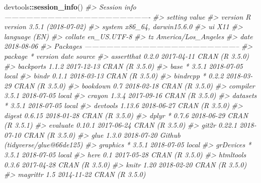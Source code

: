 \documentclass[]{book}
\newenvironment{Shaded}{\begin{snugshade}}{\end{snugshade}}
\newcommand{\CommentTok}[1]{\textcolor[rgb]{0.56,0.35,0.01}{\textit{#1}}}
\newcommand{\KeywordTok}[1]{\textcolor[rgb]{0.13,0.29,0.53}{\textbf{#1}}}
\newcommand{\NormalTok}[1]{#1}
\newcommand{\OperatorTok}[1]{\textcolor[rgb]{0.81,0.36,0.00}{\textbf{#1}}}
\theoremstyle{plain}
\theoremstyle{remark}
\theoremstyle{definition}
\theoremstyle{definition}
\theoremstyle{definition}
\theoremstyle{remark}
\begin{document}
\begin{Shaded}
\begin{Highlighting}[]
\NormalTok{devtools}\OperatorTok{::}\KeywordTok{session_info}\NormalTok{()}
\CommentTok{#> Session info -------------------------------------------------------------}
\CommentTok{#>  setting  value                       }
\CommentTok{#>  version  R version 3.5.1 (2018-07-02)}
\CommentTok{#>  system   x86_64, darwin15.6.0        }
\CommentTok{#>  ui       X11                         }
\CommentTok{#>  language (EN)                        }
\CommentTok{#>  collate  en_US.UTF-8                 }
\CommentTok{#>  tz       America/Los_Angeles         }
\CommentTok{#>  date     2018-08-06}
\CommentTok{#> Packages -----------------------------------------------------------------}
\CommentTok{#>  package    * version date       source                            }
\CommentTok{#>  assertthat   0.2.0   2017-04-11 CRAN (R 3.5.0)                    }
\CommentTok{#>  backports    1.1.2   2017-12-13 CRAN (R 3.5.0)                    }
\CommentTok{#>  base       * 3.5.1   2018-07-05 local                             }
\CommentTok{#>  bindr        0.1.1   2018-03-13 CRAN (R 3.5.0)                    }
\CommentTok{#>  bindrcpp   * 0.2.2   2018-03-29 CRAN (R 3.5.0)                    }
\CommentTok{#>  bookdown     0.7     2018-02-18 CRAN (R 3.5.0)                    }
\CommentTok{#>  compiler     3.5.1   2018-07-05 local                             }
\CommentTok{#>  crayon       1.3.4   2017-09-16 CRAN (R 3.5.0)                    }
\CommentTok{#>  datasets   * 3.5.1   2018-07-05 local                             }
\CommentTok{#>  devtools     1.13.6  2018-06-27 CRAN (R 3.5.0)                    }
\CommentTok{#>  digest       0.6.15  2018-01-28 CRAN (R 3.5.0)                    }
\CommentTok{#>  dplyr      * 0.7.6   2018-06-29 CRAN (R 3.5.1)                    }
\CommentTok{#>  evaluate     0.10.1  2017-06-24 CRAN (R 3.5.0)                    }
\CommentTok{#>  git2r        0.22.1  2018-07-10 CRAN (R 3.5.0)                    }
\CommentTok{#>  glue         1.3.0   2018-07-20 Github (tidyverse/glue@66de125)   }
\CommentTok{#>  graphics   * 3.5.1   2018-07-05 local                             }
\CommentTok{#>  grDevices  * 3.5.1   2018-07-05 local                             }
\CommentTok{#>  here         0.1     2017-05-28 CRAN (R 3.5.0)                    }
\CommentTok{#>  htmltools    0.3.6   2017-04-28 CRAN (R 3.5.0)                    }
\CommentTok{#>  knitr        1.20    2018-02-20 CRAN (R 3.5.0)                    }
\CommentTok{#>  magrittr     1.5     2014-11-22 CRAN (R 3.5.0)                    }

\end{Highlighting}
\end{Shaded}
\end{document}
